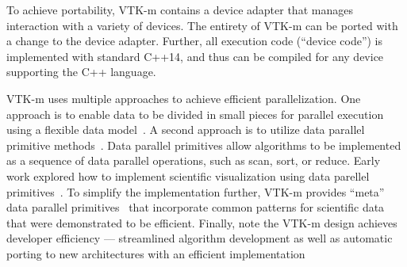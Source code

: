 To achieve portability, VTK-m contains a device adapter that manages interaction with a variety of devices.
The entirety of VTK-m can be ported with a change to the device adapter.
%
Further, all execution code (``device code'') is implemented with standard C++14,
and thus can be compiled for any device supporting the C++ language.

VTK-m uses multiple approaches to achieve efficient parallelization.
One approach is 
to enable data to be divided in small pieces for parallel execution
using a 
flexible data model~\cite{Meredith2012}.
A second approach is 
to utilize
data parallel primitive methods~\cite{Blelloch1990}.
Data parallel primitives allow algorithms to be implemented as a sequence of data parallel operations, such as scan, sort, or reduce.
Early work explored how to implement scientific visualization using data parellel primitives~\cite{Lo2012}.
To simplify the implementation further, VTK-m provides ``meta'' data parallel primitives~\cite{Moreland2021} that incorporate common patterns for scientific data that were demonstrated to be efficient.
Finally, note the VTK-m design achieves developer efficiency --- 
streamlined algorithm development as well as 
automatic
porting to new architectures with an efficient implementation 
